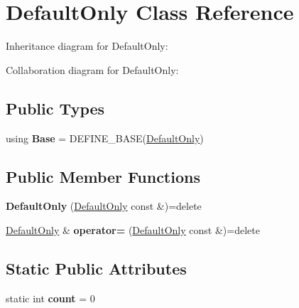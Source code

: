 \hypertarget{struct_default_only}{}\section{Default\+Only Class Reference}
\label{struct_default_only}


Inheritance diagram for Default\+Only\+:


Collaboration diagram for Default\+Only\+:
\subsection*{Public Types}
\begin{DoxyCompactItemize}
\item 
\mbox{\label{struct_default_only_a1596dd13bb70f466841210073341c9e4}} 
using {\bfseries Base} = D\+E\+F\+I\+N\+E\+\_\+\+B\+A\+SE(\mbox{\hyperlink{struct_default_only}{Default\+Only}})
\end{DoxyCompactItemize}
\subsection*{Public Member Functions}
\begin{DoxyCompactItemize}
\item 
\mbox{\label{struct_default_only_a7b95edf6f46b70bd4d24432dd341f8cf}} 
{\bfseries Default\+Only} (\mbox{\hyperlink{struct_default_only}{Default\+Only}} const \&)=delete
\item 
\mbox{\label{struct_default_only_a3c4a9ef21578bb02810886fb40a494a6}} 
\mbox{\hyperlink{struct_default_only}{Default\+Only}} \& {\bfseries operator=} (\mbox{\hyperlink{struct_default_only}{Default\+Only}} const \&)=delete
\end{DoxyCompactItemize}
\subsection*{Static Public Attributes}
\begin{DoxyCompactItemize}
\item 
\mbox{\label{struct_default_only_a6f19ca5059552b40442e9dde1858436a}} 
static int {\bfseries count} = 0
\end{DoxyCompactItemize}
